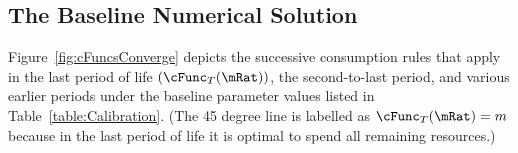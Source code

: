 \documentclass[BufferStockTheory]{subfiles}
\begin{document}
\begin{comment}
  A useful alternative version is
  \begin{verbatimwrite}{\EqDir/FVACAlt}
    \begin{align}
      \DiscFac \Rfree \PGro^{-\CRRA} \uInvEpShkuInv^{1-\CRRA}   & < \Rfree/\PGro \nonumber
      \\ \PatPGro \uInvEpShkuInv^{1/\CRRA-1}  & < (\Rfree/\PGro)^{1/\CRRA} \label{eq:FVACAlt}.
    \end{align}
  \end{verbatimwrite}
  
\end{comment}

\begin{comment}
  In the case where the permanent shocks are lognormally distributed, we have
  \begin{align}
    \Ex[\pshk^{1-\CRRA}] & = &\exp((1-\CRRA)(-\sigma^{2}_{\pshk}/2)+(1-\CRRA)^{2}\sigma_{\pshk}^{2})
    \\  & = \exp((1-\CRRA)((-1/2)+(1-\CRRA))\sigma_{\pshk}^{2})
    \\  & = \exp((1-\CRRA)(1/2-\CRRA)\sigma_{\pshk}^{2})
  \end{align}
\end{comment}

\begin{comment}
  Equation
  \eqref{eq:GIC} can be raised to the $\CRRA$ power yielding the
  alternative form $(\Rfree \DiscFac) \PGroAdj^{-\CRRA} < 1$ which
  Deaton~\citeyearpar{deatonLiqConstr} imposed to guarantee that his
  problem defined a contraction mapping.
\end{comment}


\hypertarget{Baseline-Numerical-Solution}{}
\subsection{The Baseline Numerical Solution}

Figure~\ref{fig:cFuncsConverge} depicts the successive consumption
rules that apply in the last period of life $(\cFunc_{T}(\mRat))$, the
second-to-last period, and various earlier periods under the
baseline parameter values listed in Table~\ref{table:Calibration}.
(The 45 degree line is labelled as $\cFunc_{T}(\mRat) = m$ because in
the last period of life it is optimal to spend all remaining
resources.)

\hypertarget{Calibration}{}


\end{document}
